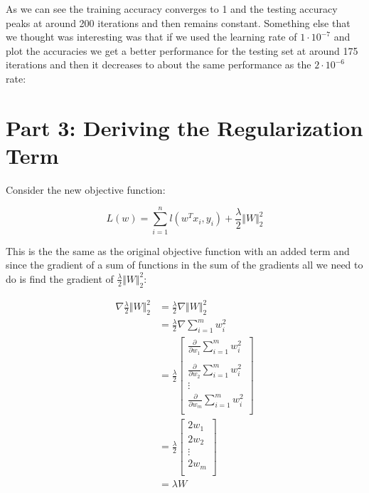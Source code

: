 \documentclass{article}
\begin{document}
As we can see the training accuracy converges to 1 and the testing accuracy peaks at around 200 iterations and then remains constant. Something else that we thought was interesting was that if we used the learning rate of $1 \cdot 10^{-7}$ and plot the accuracies we get a better performance for the testing set at around 175 iterations and then it decreases to about the same performance as the $2 \cdot 10^{-6}$ rate:

\newpage




	\section*{Part 3: Deriving the Regularization Term}
Consider the new objective function:
	
	$$
	L(w) = \sum_{i = 1}^{n} l(w^{T} x_{i}, y_{i}) + \frac{\lambda}{2} \Vert W \Vert_{2}^{2}
	$$
	
	This is the the same as the original objective function with an added term and since the gradient of a sum of functions in the sum of the gradients all we need to do is find the gradient of $\frac{\lambda}{2} \Vert W \Vert_{2}^{2}$:
	
	\begin{align}
	\nabla \frac{\lambda}{2} \Vert W \Vert_{2}^{2} &= \frac{\lambda}{2} \nabla \Vert W \Vert_{2}^{2} \\
	 &= \frac{\lambda}{2} \nabla \sum_{i = 1}^{m} w_{i}^{2} \\
	 &= \frac{\lambda}{2} \begin{bmatrix}
		 \frac{\partial}{\partial w_{1}} \sum_{i = 1}^{m} w_{i}^{2} \\ \\
		 \frac{\partial}{\partial w_{2}} \sum_{i = 1}^{m} w_{i}^{2} \\
		 \vdots \\
		 \frac{\partial}{\partial w_{m}} \sum_{i = 1}^{m} w_{i}^{2} \\
		 \end{bmatrix}\\
	&= \frac{\lambda}{2} \begin{bmatrix}
	2 w_{1} \\
	2 w_{2} \\
	\vdots \\
	2 w_{m} \\
	 \end{bmatrix}\\
	&= \lambda W
	\end{align}
	
\end{document}
